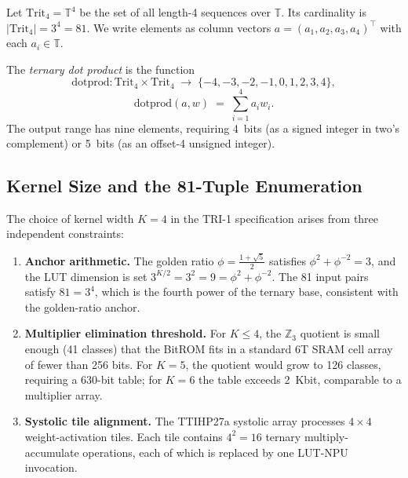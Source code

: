 \begin{definition}
\label{def:trit4}
Let \(\mathrm{Trit}_4 = \mathbb{T}^4\) be the set of all length-4
sequences over \(\mathbb{T}\).  Its cardinality is \(|\mathrm{Trit}_4|
= 3^4 = 81\).  We write elements as column vectors
\(a = (a_1, a_2, a_3, a_4)^{\top}\) with each \(a_i \in \mathbb{T}\).
\end{definition}

\begin{definition}
\label{def:ternary_dot}
The \emph{ternary dot product} is the function
\[
  \mathrm{dotprod} \colon \mathrm{Trit}_4 \times \mathrm{Trit}_4
  \;\longrightarrow\; \{-4,-3,-2,-1,0,1,2,3,4\},
\]
\[
  \mathrm{dotprod}(a, w) \;=\; \sum_{i=1}^{4} a_i w_i.
\]
The output range has nine elements, requiring 4~bits (as a signed integer
in two's complement) or 5~bits (as an offset-4 unsigned integer).
\end{definition}

\subsection{Kernel Size and the 81-Tuple Enumeration}
\label{subsec:kernel_size}

The choice of kernel width \(K=4\) in the TRI-1 specification arises from
three independent constraints:

\begin{enumerate}
  \item \textbf{Anchor arithmetic.}  The golden ratio
        \(\phi = \tfrac{1+\sqrt{5}}{2}\) satisfies
        \(\phi^2 + \phi^{-2} = 3\), and the LUT dimension is set
        \(3^{K/2} = 3^2 = 9 = \phi^2 + \phi^{-2}\).  The 81 input
        pairs satisfy \(81 = 3^4\), which is the fourth power of the
        ternary base, consistent with the golden-ratio anchor.
  \item \textbf{Multiplier elimination threshold.}  For \(K \leq 4\),
        the \(\mathbb{Z}_3\) quotient is small enough (41 classes) that
        the BitROM fits in a standard 6T SRAM cell array of fewer than
        256 bits.  For \(K=5\), the quotient would grow to 126 classes,
        requiring a 630-bit table; for \(K=6\) the table exceeds 2~Kbit,
        comparable to a multiplier array.
  \item \textbf{Systolic tile alignment.}  The TTIHP27a systolic array
        processes \(4 \times 4\) weight-activation tiles.  Each tile
        contains \(4^2 = 16\) ternary multiply-accumulate operations,
        each of which is replaced by one LUT-NPU invocation.
\end{enumerate}

